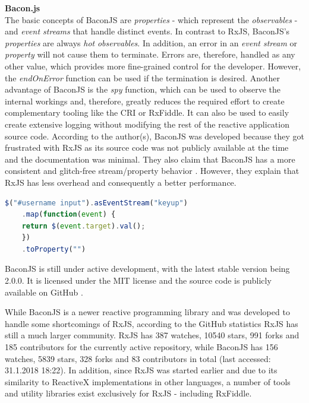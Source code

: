 	\textbf{Bacon.js}\\
	The basic concepts of BaconJS \cite{BaconJS} are \emph{properties} - which represent the \emph{observables} - and \emph{event streams} that handle distinct events. 
	In contrast to RxJS, BaconJS's \emph{properties} are always \emph{hot} \emph{observables}. In addition, an error in an \emph{event stream} or \emph{property} will not cause them to terminate. Errors are, therefore, handled as any other value, which provides more fine-grained control for the developer. However, the \emph{endOnError} function can be used if the termination is desired. 
	Another advantage of BaconJS is the \emph{spy} function, which can be used to observe the internal workings and, therefore, greatly reduces the required effort to create complementary tooling like the CRI or RxFiddle. It can also be used to easily create extensive logging without modifying the rest of the reactive application source code. According to the author(s), BaconJS was developed because they got frustrated with RxJS as its source code was not publicly available at the time and the documentation was minimal. They also claim that BaconJS has a more consistent and glitch-free stream/property behavior \cite{BaconJSRepo}. However, they explain that RxJS has less overhead and consequently a better performance. 
		\begin{lstlisting}[language=JavaScript, caption={Example of BaconJS code.},label={lst:Bacon}]
	$("#username input").asEventStream("keyup")
	.map(function(event) {
	return $(event.target).val();
	})
	.toProperty("")
	\end{lstlisting}
	BaconJS is still under active development, with the latest stable version being 2.0.0. It is licensed under the MIT license and the source code is publicly available on GitHub \cite{BaconJSRepo}.

	While BaconJS is a newer reactive programming library and was developed to handle some shortcomings of RxJS, according to the GitHub statistics RxJS has still a much larger community. RxJS has 387 watches, 10540 stars, 991 forks and 185 contributors for the currently active repository, while BaconJS has 156 watches, 5839 stars, 328 forks and 83 contributors in total (last accessed: 31.1.2018 18:22).
	In addition, since RxJS was started earlier and due to its similarity to ReactiveX implementations in other languages, a number of tools and utility libraries exist exclusively for RxJS - including RxFiddle.


